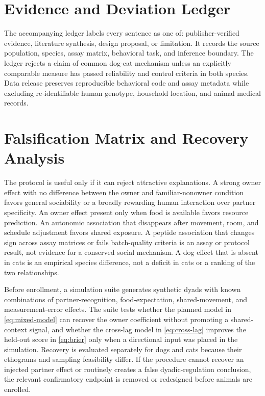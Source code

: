\documentclass[conference]{IEEEtran}
\begin{document}
\section{Evidence and Deviation Ledger}

The accompanying ledger labels every sentence as one of: publisher-verified evidence, literature synthesis, design proposal, or limitation. It records the source population, species, assay matrix, behavioral task, and inference boundary. The ledger rejects a claim of common dog-cat mechanism unless an explicitly comparable measure has passed reliability and control criteria in both species. Data release preserves reproducible behavioral code and assay metadata while excluding re-identifiable human genotype, household location, and animal medical records.

\section{Falsification Matrix and Recovery Analysis}

The protocol is useful only if it can reject attractive explanations. A strong owner effect with no difference between the owner and familiar-nonowner condition favors general sociability or a broadly rewarding human interaction over partner specificity. An owner effect present only when food is available favors resource prediction. An autonomic association that disappears after movement, room, and schedule adjustment favors shared exposure. A peptide association that changes sign across assay matrices or fails batch-quality criteria is an assay or protocol result, not evidence for a conserved social mechanism. A dog effect that is absent in cats is an empirical species difference, not a deficit in cats or a ranking of the two relationships.

Before enrollment, a simulation suite generates synthetic dyads with known combinations of partner-recognition, food-expectation, shared-movement, and measurement-error effects. The suite tests whether the planned model in \eqref{eq:mixed-model} can recover the owner coefficient without promoting a shared-context signal, and whether the cross-lag model in \eqref{eq:cross-lag} improves the held-out score in \eqref{eq:brier} only when a directional input was placed in the simulation. Recovery is evaluated separately for dogs and cats because their ethograms and sampling feasibility differ. If the procedure cannot recover an injected partner effect or routinely creates a false dyadic-regulation conclusion, the relevant confirmatory endpoint is removed or redesigned before animals are enrolled.
\end{document}
